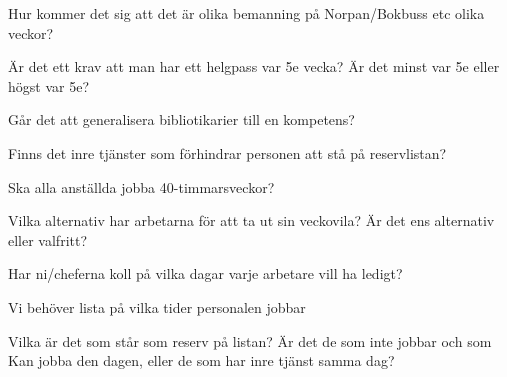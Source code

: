 Hur kommer det sig att det är olika bemanning på Norpan/Bokbuss etc olika veckor?

Är det ett krav att man har ett helgpass var 5e vecka? Är det minst var 5e eller högst var 5e?

Går det att generalisera bibliotikarier till en kompetens?

Finns det inre tjänster som förhindrar personen att stå på reservlistan?

Ska alla anställda jobba 40-timmarsveckor?

Vilka alternativ har arbetarna för att ta ut sin veckovila? Är det ens alternativ eller valfritt?

Har ni/cheferna koll på vilka dagar varje arbetare vill ha ledigt?

Vi behöver lista på vilka tider personalen jobbar

Vilka är det som står som reserv på listan? Är det de som inte jobbar och som Kan jobba den dagen, eller de som har inre tjänst samma dag?